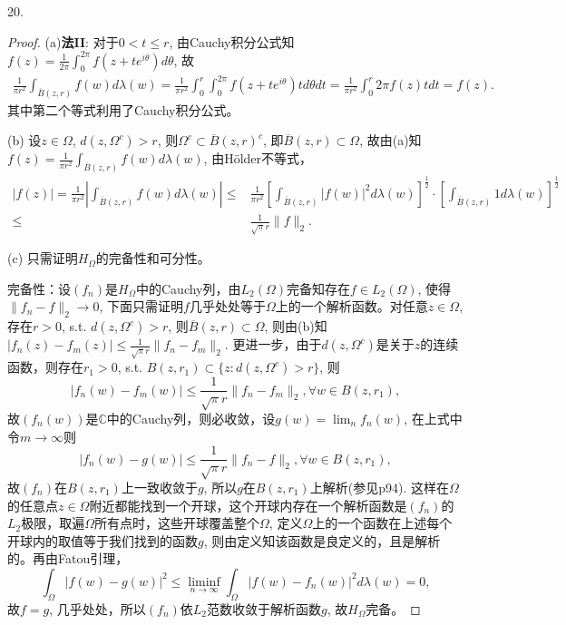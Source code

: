 \documentclass[a4paper,8pt]{ctexart}\textwidth 140mm \textheight 216mm
\newcommand{\8}{\infty}
\begin{document}
20. 
\begin{proof}
	
	(a)\textbf{法II}: 对于$0< t\leq r$, 由Cauchy积分公式知 $f(z)=\frac{1}{2\pi}\int_0^{2\pi}f(z+te^{i\theta})d\theta$, 故
	\begin{equation*}
	\begin{split}
	\frac{1}{\pi r^2}\int_{\overline{B}(z,r)}f(w)d\lambda(w)=\frac{1}{\pi r^2}\int_0^r\int_0^{2\pi}f(z+te^{i\theta})td\theta dt=\frac{1}{\pi r^2}\int_0^r 2\pi f(z)tdt=f(z).
	\end{split}
	\end{equation*} 
	其中第二个等式利用了Cauchy积分公式。
	
	(b) 设$z\in \Omega$, $d(z,\Omega^c)>r$, 则$\Omega^c\subset \overline{B}(z,r)^c$, 即$\overline{B}(z,r)\subset \Omega$, 故由(a)知$f(z)=\frac{1}{\pi r^2}\int_{\overline{B}(z,r)}f(w)d\lambda(w)$, 由H\"older不等式，
	\begin{equation*}
	\begin{split}
	|f(z)|=\frac{1}{\pi r^2}|\int_{\overline{B}(z,r)}f(w)d\lambda(w)|\leq &  \frac{1}{\pi r^2}[\int_{\overline{B}(z,r)}|f(w)|^2d\lambda(w)]^{\frac{1}{2}}\cdot [\int_{\overline{B}(z,r)}1 d\lambda(w)]^{\frac{1}{2}}\\
	\leq &\frac{1}{\sqrt{\pi}r}\|f\|_2.
	\end{split}
	\end{equation*}
	
	(c) 只需证明$H_\Omega$的完备性和可分性。
	
	完备性：设$(f_n)$是$H_\Omega$中的Cauchy列，由$L_2(\Omega)$完备知存在$f\in L_2(\Omega)$, 使得$\|f_n-f\|_2\to 0$, 下面只需证明$f$几乎处处等于$\Omega$上的一个解析函数。对任意$z\in \Omega$, 存在$r>0$, s.t. $d(z,\Omega^c)>r$, 则$\overline{B}(z,r)\subset \Omega$, 则由(b)知$|f_n(z)-f_m(z)|\leq \frac{1}{\sqrt{\pi}r}\|f_n-f_m\|_2$. 更进一步，由于$d(z,\Omega^c)$是关于$z$的连续函数，则存在$r_1>0$, s.t. $B(z,r_1)\subset \{z:d(z,\Omega^c)>r\}$, 则
	\begin{equation*}
	|f_n(w)-f_m(w)|\leq \frac{1}{\sqrt{\pi}r}\|f_n-f_m\|_2, \forall w\in B(z,r_1),
	\end{equation*}
	故$(f_n(w))$是$\mathbb{C}$中的Cauchy列，则必收敛，设$g(w)=\lim_{n}f_n(w)$, 在上式中令$m\to\infty$则
	\begin{equation*}
	|f_n(w)-g(w)|\leq \frac{1}{\sqrt{\pi}r}\|f_n-f\|_2, \forall w\in B(z,r_1),
	\end{equation*}
	故$(f_n)$在$B(z,r_1)$上一致收敛于$g$, 所以$g$在$B(z,r_1)$上解析(参见p94). 这样在$\Omega$的任意点$z\in \Omega$附近都能找到一个开球，这个开球内存在一个解析函数是$(f_n)$的$L_2$极限，取遍$\Omega$所有点时，这些开球覆盖整个$\Omega$, 定义$\Omega$上的一个函数在上述每个开球内的取值等于我们找到的函数$g$, 则由定义知该函数是良定义的，且是解析的。再由Fatou引理，
	\begin{equation*}
	\int_\Omega|f(w)-g(w)|^2\leq \liminf_{n\to\infty}\int_\Omega|f(w)-f_n(w)|^2d\lambda(w)=0,
	\end{equation*}
	故$f=g$, 几乎处处，所以$(f_n)$依$L_2$范数收敛于解析函数$g$, 故$H_\Omega$完备。
	

\end{proof}
\end{document}
